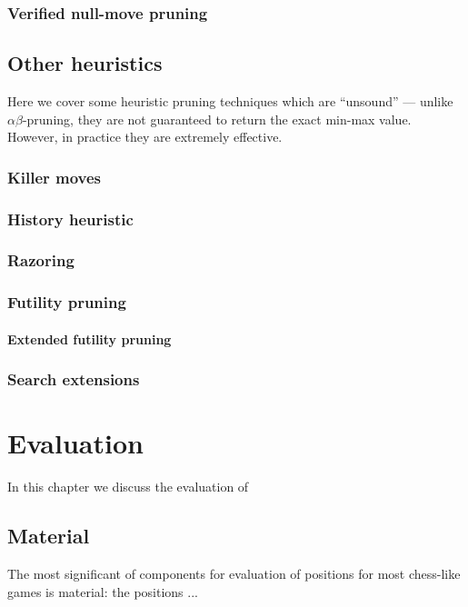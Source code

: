 \documentclass[10pt,dvipdfmx]{report}
\newcommand{\ab}{{$\alpha\beta$}}
\begin{document}
\subsection{Verified null-move pruning}

\section{Other heuristics}
Here we cover some heuristic pruning techniques which are ``unsound'' --- unlike
\ab-pruning, they are not guaranteed to return the exact min-max value.  However,
in practice they are extremely effective.
\subsection{Killer moves}
\subsection{History heuristic}
\subsection{Razoring}
\subsection{Futility pruning}
\subsubsection{Extended futility pruning}
\subsection{Search extensions}

\chapter{Evaluation}
\label{chap-evaluation}

In this chapter we discuss the evaluation of

\section{Material}
The most significant of components for evaluation
of positions for most chess-like games is material:
the positions ...
\end{document}
